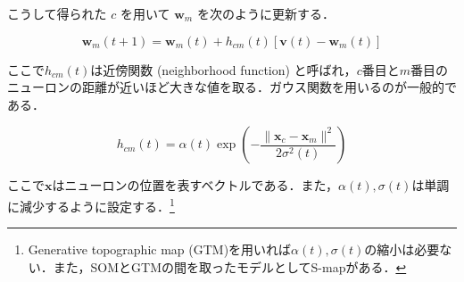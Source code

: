 \documentclass[titlepage]{ltjsbook}
\begin{document}
こうして得られた $c$ を用いて $\mathbf{w}_m$ を次のように更新する．

\begin{equation}
\mathbf{w}_m(t+1)=\mathbf{w}_m(t)+h_{cm}(t)[\mathbf{v}(t)-\mathbf{w}_m(t)]
\end{equation}

ここで$h_{cm}(t)$は近傍関数 (neighborhood function) と呼ばれ，$c$番目と$m$番目のニューロンの距離が近いほど大きな値を取る．ガウス関数を用いるのが一般的である．

\begin{equation}
h_{cm}(t)=\alpha(t)\exp\left(-\frac{\|\mathbf{x}_c-\mathbf{x}_m\|^2}{2\sigma^2(t)}\right)
\end{equation}

ここで$\mathbf{x}$はニューロンの位置を表すベクトルである．また，$\alpha(t), \sigma(t)$は単調に減少するように設定する．\footnote{Generative topographic map (GTM)を用いれば$\alpha(t), \sigma(t)$の縮小は必要ない．また，SOMとGTMの間を取ったモデルとしてS-mapがある．}

\printbibliography[segment=\therefsegment,heading=subbibliography,title={参考文献}]
\end{document}
